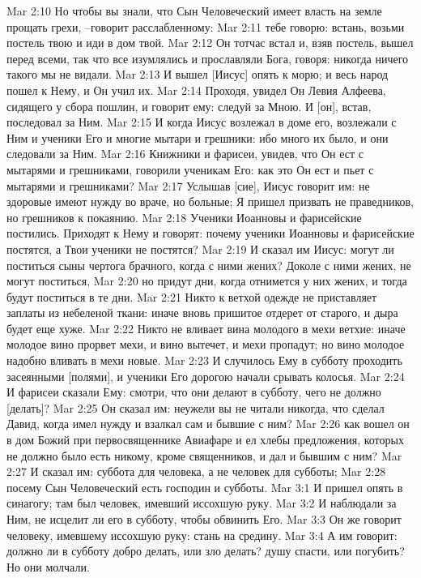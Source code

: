 Mar 2:10  Но чтобы вы знали, что Сын Человеческий имеет власть на земле прощать грехи, --говорит расслабленному:
Mar 2:11  тебе говорю: встань, возьми постель твою и иди в дом твой.
Mar 2:12  Он тотчас встал и, взяв постель, вышел перед всеми, так что все изумлялись и прославляли Бога, говоря: никогда ничего такого мы не видали.
Mar 2:13  И вышел [Иисус] опять к морю; и весь народ пошел к Нему, и Он учил их.
Mar 2:14  Проходя, увидел Он Левия Алфеева, сидящего у сбора пошлин, и говорит ему: следуй за Мною. И [он], встав, последовал за Ним.
Mar 2:15  И когда Иисус возлежал в доме его, возлежали с Ним и ученики Его и многие мытари и грешники: ибо много их было, и они следовали за Ним.
Mar 2:16  Книжники и фарисеи, увидев, что Он ест с мытарями и грешниками, говорили ученикам Его: как это Он ест и пьет с мытарями и грешниками?
Mar 2:17  Услышав [сие], Иисус говорит им: не здоровые имеют нужду во враче, но больные; Я пришел призвать не праведников, но грешников к покаянию.
Mar 2:18  Ученики Иоанновы и фарисейские постились. Приходят к Нему и говорят: почему ученики Иоанновы и фарисейские постятся, а Твои ученики не постятся?
Mar 2:19  И сказал им Иисус: могут ли поститься сыны чертога брачного, когда с ними жених? Доколе с ними жених, не могут поститься,
Mar 2:20  но придут дни, когда отнимется у них жених, и тогда будут поститься в те дни.
Mar 2:21  Никто к ветхой одежде не приставляет заплаты из небеленой ткани: иначе вновь пришитое отдерет от старого, и дыра будет еще хуже.
Mar 2:22  Никто не вливает вина молодого в мехи ветхие: иначе молодое вино прорвет мехи, и вино вытечет, и мехи пропадут; но вино молодое надобно вливать в мехи новые.
Mar 2:23  И случилось Ему в субботу проходить засеянными [полями], и ученики Его дорогою начали срывать колосья.
Mar 2:24  И фарисеи сказали Ему: смотри, что они делают в субботу, чего не должно [делать]?
Mar 2:25  Он сказал им: неужели вы не читали никогда, что сделал Давид, когда имел нужду и взалкал сам и бывшие с ним?
Mar 2:26  как вошел он в дом Божий при первосвященнике Авиафаре и ел хлебы предложения, которых не должно было есть никому, кроме священников, и дал и бывшим с ним?
Mar 2:27  И сказал им: суббота для человека, а не человек для субботы;
Mar 2:28  посему Сын Человеческий есть господин и субботы.
Mar 3:1  И пришел опять в синагогу; там был человек, имевший иссохшую руку.
Mar 3:2  И наблюдали за Ним, не исцелит ли его в субботу, чтобы обвинить Его.
Mar 3:3  Он же говорит человеку, имевшему иссохшую руку: стань на средину.
Mar 3:4  А им говорит: должно ли в субботу добро делать, или зло делать? душу спасти, или погубить? Но они молчали.
